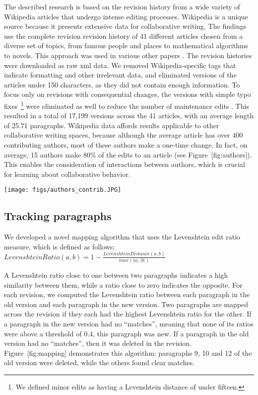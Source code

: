 The described research is based on the revision history from a wide
variety of Wikipedia articles that undergo intense editing processes.
Wikipedia is a unique source because it presents extensive data for
collaborative writing. The findings use the complete revision revision
history of 41 different articles chosen from a diverse set of topics,
from famous people and places to mathematical algorithms to novels. This
approach was used in various other papers
\cite{wohner2009assessing, fong2010did}. The revision histories were
downloaded as raw xml data. We removed Wikipedia-specific tags that
indicate formatting and other irrelevant data, and eliminated versions
of the articles under 150 characters, as they did not contain enough
information. To focus only on revisions with consequential changes, the
versions with simple typo fixes~\footnote{We defined minor edits as
  having a Levenshtein distance of under fifteen.} were eliminated as
well to reduce the number of maintenance edits \cite{kittur2007he}. This
resulted in a total of 17,199 versions across the 41 articles, with an
average length of 25.71 paragraphs. Wikipedia data affords results
applicable to other collaborative writing spaces, because although the
average article has over 400 contributing authors, most of these authors
make a one-time change. In fact, on average, 15 authors make 80\% of the
edits to an article (see Figure~{[}fig:authors{]}). This enables the
consideration of interactions between authors, which is crucial for
learning about collaborative behavior.

\texttt{[image: figs/authors\_contrib.JPG]}\\

\subsection{Tracking paragraphs}\label{tracking-paragraphs}

We developed a novel mapping algorithm that uses the Levenshtein edit
ratio measure, which is defined as follows:
\(Levenshtein Ratio(a,b) = 1-\frac{Levenshtein Distance(a,b)}{max(|a|,|b|)} \)

A Levenshtein ratio close to one between two paragraphs indicates a high
similarity between them, while a ratio close to zero indicates the
opposite. For each revision, we computed the Levenshtein ratio between
each paragraph in the old version and each paragraph in the new version.
Two paragraphs are mapped across the revision if they each had the
highest Levenshtein ratio for the other. If a paragraph in the new
version had no ``matches'', meaning that none of its ratios were above a
threshold of 0.4, this paragraph was new. If a paragraph in the old
version had no ``matches'', then it was deleted in the revision.
Figure~{[}fig:mapping{]} demonstrates this algorithm: paragraphs 9, 10
and 12 of the old version were deleted, while the others found clear
matches.

